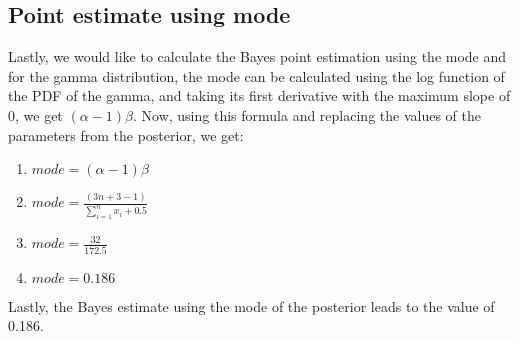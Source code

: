 \subsection{Point estimate using mode}
Lastly, we would like to calculate the Bayes point estimation using the mode and for the gamma distribution, the mode can be calculated using the log function of the PDF of the gamma, and taking its first derivative with the maximum slope of 0, we get $(\alpha -1)\beta$. Now, using this formula and replacing the values of the parameters from the posterior, we get:
\begin{enumerate}
    \item $mode = (\alpha -1)\beta$
    \item $mode = \frac{(3n+3 -1)}{\sum_{i=1}^{n}x_i +0.5}$
    \item $mode = \frac{32}{172.5}$
    \item $mode = 0.186$
\end{enumerate}
Lastly, the Bayes estimate using the mode of the posterior leads to the value of 0.186.